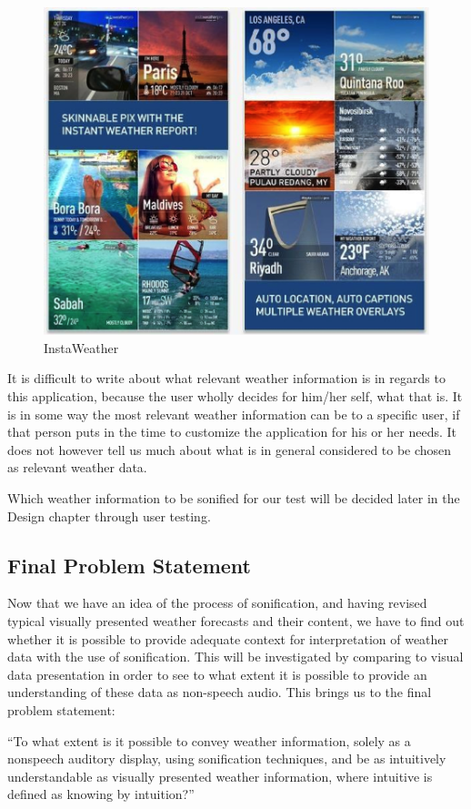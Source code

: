 \begin{figure}[!htbp]
    \centering
    \includegraphics[width=.7\textwidth]{images/Instaweather1.png}
    \caption{InstaWeather}
    \label{fig:instaweather1}
\end{figure}

It is difficult to write about what relevant weather information is in regards to this application, because the user wholly decides for him/her self, what that is. 
It is in some way the most relevant weather information can be to a specific user, if that person puts in the time to customize the application for his or her needs. 
It does not however tell us much about what is in general considered to be chosen as relevant weather data.


Which weather information to be sonified for our test will be decided later in the Design chapter through user testing.



\subsection{Final Problem Statement} %
\label{sub:final_problem_statement}

Now that we have an idea of the process of sonification, and having revised typical visually presented weather forecasts and their content, we have to find out whether it is possible to provide adequate context for interpretation of weather data with the use of sonification. 
This will be investigated by comparing to visual data presentation in order to see to what extent it is possible to provide an understanding of these data as non-speech audio. This brings us to the final problem statement:

\enquote{To what extent is it possible to convey weather information, solely as a nonspeech auditory display, using sonification techniques, and be as intuitively understandable as visually presented weather information, where intuitive is defined as knowing by intuition?}


